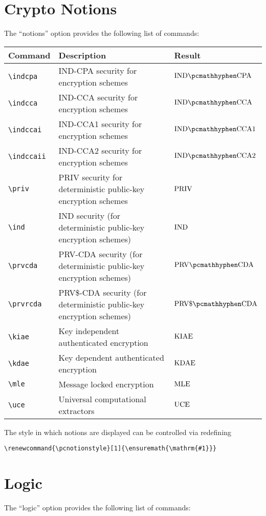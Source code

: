 \documentclass[a4paper]{report}
\begin{document}
\section{Crypto Notions}
The \enquote{notions} option provides the following list of commands:

\begin{center}
\begin{tabular}{l l l}
\textbf{Command} & \textbf{Description} & \textbf{Result} \\\hline
\lstinline$\indcpa$ & IND-CPA security for encryption schemes & $\indcpa$  \\
\lstinline$\indcca$ & IND-CCA security for encryption schemes & $\indcca$  \\
\lstinline$\indccai$ & IND-CCA1 security for encryption schemes & $\indccai$  \\
\lstinline$\indccaii$ &  IND-CCA2 security for encryption schemes & $\indccaii$  \\
\lstinline$\priv$ & PRIV security for deterministic public-key encryption schemes & $\priv$  \\
\lstinline$\ind$ & IND security (for deterministic public-key encryption schemes) & $\ind$  \\
\lstinline$\prvcda$ & PRV-CDA security (for deterministic public-key encryption schemes)& $\prvcda$  \\
\lstinline$\prvrcda$ & PRV\$-CDA security (for deterministic public-key encryption schemes) & $\prvrcda$  \\
\lstinline$\kiae$ & Key independent authenticated encryption & $\kiae$  \\
\lstinline$\kdae$ & Key dependent authenticated encryption & $\kdae$  \\
\lstinline$\mle$ & Message locked encryption & $\mle$  \\
\lstinline$\uce$ & Universal computational extractors & $\uce$  \\
\end{tabular}
\end{center}

The style in which notions are displayed can be controlled via redefining
\begin{lstlisting}
\renewcommand{\pcnotionstyle}[1]{\ensuremath{\mathrm{#1}}}
\end{lstlisting}

\section{Logic}
The \enquote{logic} option provides the following list of commands:
\end{document}
